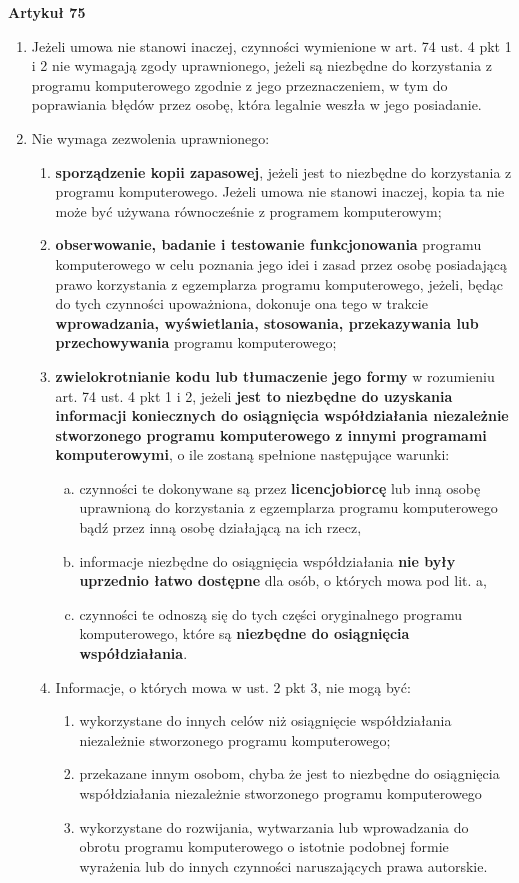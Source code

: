 \documentclass[12pt,a4paper]{article}
\begin{document}
\textbf{Artykuł 75}
\begin{enumerate}
\item Jeżeli umowa nie stanowi inaczej, czynności wymienione w art. 74 ust. 4 pkt 1 i 2 nie wymagają zgody uprawnionego, jeżeli są niezbędne do korzystania z programu komputerowego zgodnie z jego przeznaczeniem, w tym do poprawiania błędów przez osobę, która legalnie weszła w jego posiadanie.
\item Nie wymaga zezwolenia uprawnionego:
    \begin{enumerate}[1)]
        \item \textbf{sporządzenie kopii zapasowej}, jeżeli jest to niezbędne do korzystania z programu komputerowego. Jeżeli umowa nie stanowi inaczej, kopia ta nie może być używana równocześnie z programem komputerowym;
        \item\textbf{ obserwowanie, badanie i testowanie funkcjonowania} programu komputerowego w celu poznania jego idei i zasad przez osobę posiadającą prawo korzystania z egzemplarza programu komputerowego, jeżeli, będąc do tych czynności upoważniona, dokonuje ona tego w trakcie \textbf{wprowadzania, wyświetlania, stosowania, przekazywania lub przechowywania} programu komputerowego;
        \item \textbf{zwielokrotnianie kodu lub tłumaczenie jego formy} w rozumieniu art. 74 ust. 4 pkt 1 i 2, jeżeli \textbf{jest to niezbędne do uzyskania informacji koniecznych do osiągnięcia współdziałania niezależnie stworzonego programu komputerowego z innymi programami komputerowymi}, o ile zostaną spełnione następujące warunki:
            \begin{enumerate}[a)]
                \item czynności te dokonywane są przez \textbf{licencjobiorcę} lub inną osobę uprawnioną do korzystania z egzemplarza programu komputerowego bądź przez inną osobę działającą na ich rzecz,
                \item informacje niezbędne do osiągnięcia współdziałania \textbf{nie były uprzednio łatwo dostępne} dla osób, o których mowa pod lit. a,
                \item czynności te odnoszą się do tych części oryginalnego programu komputerowego, które są \textbf{niezbędne do osiągnięcia współdziałania}.
            \end{enumerate}
\item Informacje, o których mowa w ust. 2 pkt 3, nie mogą być:
    \begin{enumerate}[1)]
        \item wykorzystane do innych celów niż osiągnięcie współdziałania niezależnie         stworzonego programu komputerowego;
        \item  przekazane innym osobom, chyba że jest to niezbędne do osiągnięcia         współdziałania niezależnie stworzonego programu komputerowego
        \item wykorzystane do rozwijania, wytwarzania lub wprowadzania do obrotu programu         komputerowego o istotnie podobnej formie wyrażenia lub do innych         czynności naruszających prawa autorskie.
        \end{enumerate}
	\end{enumerate}
\end{enumerate}
\end{document}
